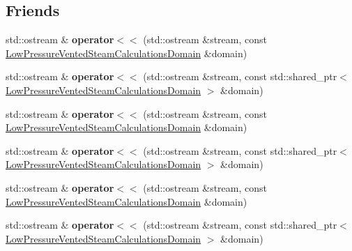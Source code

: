 \subsection*{Friends}
\begin{DoxyCompactItemize}
\item 
\mbox{\label{class_low_pressure_vented_steam_calculations_domain_a7ada490bb22ad0ecb04564180ccfa202}} 
std\+::ostream \& {\bfseries operator$<$$<$} (std\+::ostream \&stream, const \hyperlink{class_low_pressure_vented_steam_calculations_domain}{Low\+Pressure\+Vented\+Steam\+Calculations\+Domain} \&domain)
\item 
\mbox{\label{class_low_pressure_vented_steam_calculations_domain_a13dfa2323c76f3ba7b203edb7f250102}} 
std\+::ostream \& {\bfseries operator$<$$<$} (std\+::ostream \&stream, const std\+::shared\+\_\+ptr$<$ \hyperlink{class_low_pressure_vented_steam_calculations_domain}{Low\+Pressure\+Vented\+Steam\+Calculations\+Domain} $>$ \&domain)
\item 
\mbox{\label{class_low_pressure_vented_steam_calculations_domain_a7ada490bb22ad0ecb04564180ccfa202}} 
std\+::ostream \& {\bfseries operator$<$$<$} (std\+::ostream \&stream, const \hyperlink{class_low_pressure_vented_steam_calculations_domain}{Low\+Pressure\+Vented\+Steam\+Calculations\+Domain} \&domain)
\item 
\mbox{\label{class_low_pressure_vented_steam_calculations_domain_a13dfa2323c76f3ba7b203edb7f250102}} 
std\+::ostream \& {\bfseries operator$<$$<$} (std\+::ostream \&stream, const std\+::shared\+\_\+ptr$<$ \hyperlink{class_low_pressure_vented_steam_calculations_domain}{Low\+Pressure\+Vented\+Steam\+Calculations\+Domain} $>$ \&domain)
\item 
\mbox{\label{class_low_pressure_vented_steam_calculations_domain_a7ada490bb22ad0ecb04564180ccfa202}} 
std\+::ostream \& {\bfseries operator$<$$<$} (std\+::ostream \&stream, const \hyperlink{class_low_pressure_vented_steam_calculations_domain}{Low\+Pressure\+Vented\+Steam\+Calculations\+Domain} \&domain)
\item 
\mbox{\label{class_low_pressure_vented_steam_calculations_domain_a13dfa2323c76f3ba7b203edb7f250102}} 
std\+::ostream \& {\bfseries operator$<$$<$} (std\+::ostream \&stream, const std\+::shared\+\_\+ptr$<$ \hyperlink{class_low_pressure_vented_steam_calculations_domain}{Low\+Pressure\+Vented\+Steam\+Calculations\+Domain} $>$ \&domain)
\end{DoxyCompactItemize}


